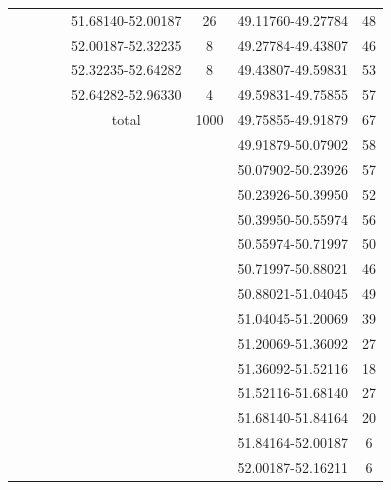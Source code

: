 \begin{table}[p]
\begin{center}
\begin{tabular}{cccccccc}
                                        & & & & 51.68140-52.00187 &  26 & 49.11760-49.27784 & 48 \\
                                        & & & & 52.00187-52.32235 &   8 & 49.27784-49.43807 & 46 \\
                                        & & & & 52.32235-52.64282 &   8 & 49.43807-49.59831 & 53 \\
                                        & & & & 52.64282-52.96330 &   4 & 49.59831-49.75855 & 57 \\
                                                              & & & & total & 1000 & 49.75855-49.91879 & 67 \\
                                                              & & & & & & 49.91879-50.07902 & 58 \\
                                                              & & & & & & 50.07902-50.23926 & 57 \\
                                                              & & & & & & 50.23926-50.39950 & 52 \\
                                                              & & & & & & 50.39950-50.55974 & 56 \\
                                                              & & & & & & 50.55974-50.71997 & 50 \\
                                                              & & & & & & 50.71997-50.88021 & 46 \\
                                                              & & & & & & 50.88021-51.04045 & 49 \\
                                                              & & & & & & 51.04045-51.20069 & 39 \\
                                                              & & & & & & 51.20069-51.36092 & 27 \\
                                                              & & & & & & 51.36092-51.52116 & 18 \\
                                                              & & & & & & 51.52116-51.68140 & 27 \\
                                                              & & & & & & 51.68140-51.84164 & 20 \\
                                                              & & & & & & 51.84164-52.00187 &  6 \\
                                                              & & & & & & 52.00187-52.16211 &  6 \\

\end{tabular}
\end{center}
\end{table}
